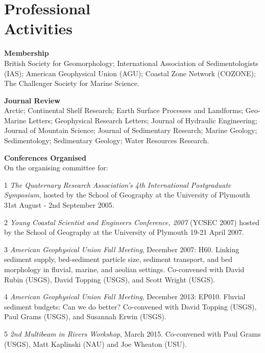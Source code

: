 \documentclass[margin,line]{resume}
\begin{document}
\begin{resume}
\begin{footnotesize}
        \end{footnotesize}

    \section{\mysidestyle Professional \\Activities}
    \begin{footnotesize} 
    {\bf Membership}\\
    British Society for Geomorphology; International Association of Sedimentologists (IAS); American Geophysical Union (AGU); Coastal Zone Network (COZONE); The Challenger Society for Marine Science.

    {\bf Journal Review} \\
 	Arctic; Continental Shelf Research; Earth Surface Processes and Landforms; Geo-Marine Letters; Geophysical Research Letters; Journal of Hydraulic Engineering; Journal of Mountain Science; Journal of Sedimentary Research; Marine Geology; Sedimentology; Sedimentary Geology; Water Resources Research.
     \end{footnotesize}

    \begin{footnotesize} 
    {\bf Conferences Organised}\\
	On the organising committee for:
	\begin{list1}
	\item[1] {\sl The Quaternary Research Association's 4th International Postgraduate Symposium}, hosted by the School of Geography at the University of Plymouth 31st August - 2nd September 2005.\\
	\item[2] {\sl Young Coastal Scientist and Engineers Conference, 2007} (YCSEC 2007)  hosted by the School of Geography at the University of Plymouth 19-21 April 2007. \\
	\item[3] {\sl American Geophysical Union Fall Meeting}, December 2007: H60. Linking sediment supply, bed-sediment particle size, sediment transport, and bed morphology in fluvial, marine, and aeolian settings. Co-convened with David Rubin (USGS), David Topping (USGS), and Scott Wright (USGS).\\
	\item[4] {\sl American Geophysical Union Fall Meeting}, December 2013: EP010. Fluvial sediment budgets: Can we do better? Co-convened with David Topping (USGS), Paul Grams (USGS), and Susannah Erwin (USGS).\\
	\item[5] {\sl 2nd Multibeam in Rivers Workshop}, March 2015. Co-convened with Paul Grams (USGS), Matt Kaplinski (NAU) and Joe Wheaton (USU).	
	\end{list1}
        \end{footnotesize}


\end{resume}
\end{document}
